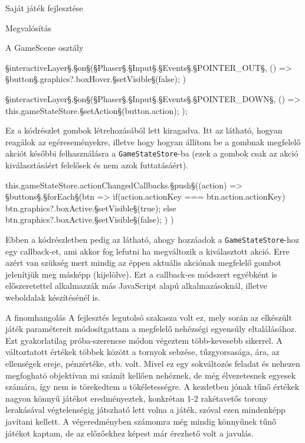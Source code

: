 \begin{MyChapter}{Saját játék fejlesztése}
\begin{MySection}{Megvalósítás}
\begin{MySubSection}{A GameScene osztály}
\begin{javascript}
{	§\color{jsConst}interactiveLayer§.§\color{jsMethod}on§(§\color{jsType}Phaser§.§\color{jsType}Input§.§\color{jsType}Events§.§\color{jsConst}POINTER\_OUT§, () => {
		§\color{jsConst}button§.graphics?.boxHover.§\color{jsMethod}setVisible§(false);
	})
	
	§\color{jsConst}interactiveLayer§.§\color{jsMethod}on§(§\color{jsType}Phaser§.§\color{jsType}Input§.§\color{jsType}Events§.§\color{jsConst}POINTER\_DOWN§, () => {
		this.gameStateStore.§\color{jsMethod}setAction§(button.action);
	});
}
			\end{javascript}
			Ez a kódrészlet gombok létrehozásából lett kiragadva. Itt az látható, hogyan reagálok az egéreseményekre, illetve hogy hogyan állítom be a gombnak megfelelő akciót későbbi felhasználásra a \texttt{GameStateStore}-ba (ezek a gombok csak az akció kiválasztásáért felelősek és nem azok futtatásáért).
			\begin{javascript}
this.gameStateStore.actionChangedCallbacks.§\color{jsMethod}push§((action) => {
	§\color{jsConst}buttons§.§\color{jsMethod}forEach§(btn => {
		if(action.actionKey === btn.action.actionKey) {
			btn.graphics?.boxActive.§\color{jsMethod}setVisible§(true);
		} else {
			btn.graphics?.boxActive.§\color{jsMethod}setVisible§(false);
		}
	})
})
			\end{javascript}
			Ebben a kódrészletben pedig az látható, ahogy hozzáadok a \texttt{GameStateStore}-hoz egy callback-et, ami akkor fog lefutni ha megváltozik a kiválasztott akció. Erre azért van szükség mert mindig az éppen aktuális akciónak megfelelő gombot jelenítjük meg másképp (kijelölve). Ezt a callback-es módszert egyébként is előszeretettel alkalmazzák más JavaScript alapú alkalmazásoknál, illetve weboldalak készítésénél is.
		\end{MySubSection}
		
		\begin{MySubSection}{A finomhangolás}
			A fejlesztés legutolsó szakasza volt ez, mely során az elkészült játék paramétereit módosítgattam a megfelelő nehézségi egyensúly eltalálásához. Ezt gyakorlatilag próba-szerencse módon végeztem több-kevesebb sikerrel. A változtatott értékek többek között a tornyok sebzése, tűzgyorsasága, ára, az ellenségek ereje, pénzértéke, stb. volt. Mivel ez egy sokváltozós feladat és nehezen megfogható objektívan mi számít kellően nehéznek, de még élvezetesnek egyesek számára, így nem is törekedtem a tökéletességre.
			A kezdetben jónak tűnő értékek nagyon könnyű játékot eredményeztek, konkrétan 1-2 rakétavetős torony lerakásával végtelenségig játszható lett volna a játék, szóval ezen mindenképp javítani kellett. A végeredményben számomra még mindig könnyűnek tűnő játékot kaptam, de az előzőekhez képest már érezhető volt a javulás.
		\end{MySubSection}
			

\end{MySection}
\end{MyChapter}
